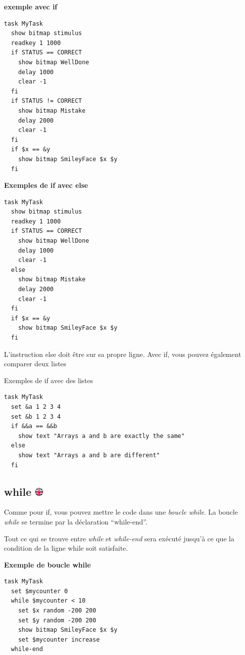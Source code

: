 \documentclass[
]{book}
\begin{document}
\textbf{exemple avec if}

\begin{verbatim}
task MyTask
  show bitmap stimulus
  readkey 1 1000
  if STATUS == CORRECT
    show bitmap WellDone
    delay 1000
    clear -1
  fi
  if STATUS != CORRECT
    show bitmap Mistake
    delay 2000
    clear -1
  fi
  if $x == &y
    show bitmap SmileyFace $x $y
  fi
\end{verbatim}

\textbf{Exemples de if avec else}

\begin{verbatim}
task MyTask
  show bitmap stimulus
  readkey 1 1000
  if STATUS == CORRECT
    show bitmap WellDone
    delay 1000
    clear -1
  else
    show bitmap Mistake
    delay 2000
    clear -1
  fi
  if $x == &y
    show bitmap SmileyFace $x $y
  fi
\end{verbatim}

L'instruction else doit être sur sa propre ligne.
Avec if, vous pouvez également comparer deux listes

Exemples de if avec des listes

\begin{verbatim}
task MyTask
  set &a 1 2 3 4
  set &b 1 2 3 4
  if &&a == &&b
    show text "Arrays a and b are exactly the same"
  else
    show text "Arrays a and b are different"
  fi
\end{verbatim}

\hypertarget{while}{%
\subsection[while ]{\texorpdfstring{while \href{https://www.psytoolkit.org/doc3.4.0/syntax.html\#task-while}{\protect\includegraphics{img/ukflag.png}}}{while }}\label{while}}

Comme pour if, vous pouvez mettre le code dans une \emph{boucle while}. La boucle \emph{while} se termine par la déclaration ``while-end''.

Tout ce qui se trouve entre \emph{while} et \emph{while-end} sera exécuté jusqu'à ce que la condition de la ligne while soit satisfaite.

\textbf{Exemple de boucle while}

\begin{verbatim}
task MyTask
  set $mycounter 0
  while $mycounter < 10
    set $x random -200 200
    set $y random -200 200
    show bitmap SmileyFace $x $y
    set $mycounter increase
  while-end
\end{verbatim}
\end{document}
